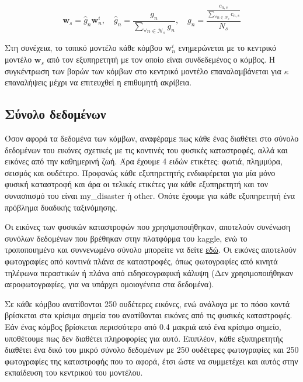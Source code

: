 \vspace{-5pt}

\begin{equation}
   \mathbf{w}_s = \hat{g}_n \mathbf{w}_n^i, \quad \hat{g}_n = \frac{g_n}{\sum\limits_{\forall n \in \mathcal{N}_s} g_n}, \quad g_n = \frac{\frac{c_{n,s}}{\sum\limits_{\forall n \in N_s} c_{n,s}}}{N_s}
    \label{eq15}
\end{equation}

\vspace{-5pt}

Στη συνέχεια, το τοπικό μοντέλο κάθε κόμβου $\mathbf{w}_n^i$ ενημερώνεται με το κεντρικό μοντέλο $\mathbf{w}_s$ από τον εξυπηρετητή με τον οποίο είναι συνδεδεμένος ο κόμβος. Η συγκέντρωση των βαρών των κόμβων στο κεντρικό μοντέλο επαναλαμβάνεται για $\kappa$ επαναλήψεις μέχρι να επιτευχθεί η επιθυμητή ακρίβεια.

\subsection{Σύνολο δεδομένων}

Όσον αφορά τα δεδομένα των κόμβων, αναφέραμε πως κάθε ένας διαθέτει στο σύνολο δεδομένων του εικόνες σχετικές με τις κοντινές του φυσικές καταστροφές, αλλά και εικόνες από την καθημερινή ζωή. Άρα έχουμε 4 ειδών ετικέτες: φωτιά, πλημμύρα, σεισμός και ουδέτερο. Προφανώς κάθε εξυπηρετητής ενδιαφέρεται για μία μόνο φυσική καταστροφή και άρα οι τελικές ετικέτες για κάθε εξυπηρετητή και τον συνασπισμό του είναι my\_disaster ή other. Οπότε έχουμε για κάθε εξυπηρετητή ένα πρόβλημα δυαδικής ταξινόμησης.

Οι εικόνες των φυσικών καταστροφών που χρησιμοποιήθηκαν, αποτελούν συνένωση συνόλων δεδομένων που βρέθηκαν στην πλατφόρμα του kaggle, ενώ το τροποποιημένο και συννενωμένο σύνολο μπορείτε να δείτε \underline{εδώ}. Οι εικόνες αποτελούν φωτογραφίες από κοντινά πλάνα σε καταστροφές, όπως φωτογραφίες από κινητά τηλέφωνα περαστικών ή πλάνα από ειδησεογραφική κάλυψη (Δεν χρησιμοποιήθηκαν αεροφωτογραφίες, για να υπάρχει ομοιογένεια στα δεδομένα).

Σε κάθε κόμβου ανατίθονται 250 ουδέτερες εικόνες, ενώ ανάλογα με το πόσο κοντά βρίσκεται στα κρίσιμα σημεία του ανατίθονται εικόνες από τις φυσικές καταστροφές. Εάν ένας κόμβος βρίσκεται περισσότερο από 0.4 μακριά από ένα κρίσιμο σημείο, υποθέτουμε πως δεν διαθέτει πληροφορίες για αυτό. Επιπλέον, κάθε εξυπηρετητής διαθέτει ένα δικό του μικρό σύνολο δεδομένων με 250 ουδέτερες φωτογραφίες και 250 φωτογραφίες της καταστροφής που το αφορά, έτσι ώστε να συμμετέχει και αυτός στην εκπαίδευση του κεντρικού του μοντέλου.

